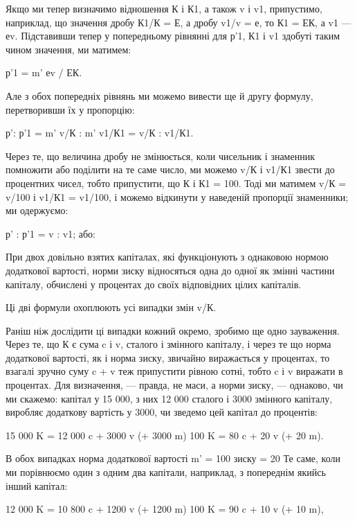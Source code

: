 Якщо ми тепер визначимо відношення К і К1, а також
v і v1, припустимо, наприклад, що значення дробу К1/К = Е, а дробу
v1/v = е, то К1 = ЕК, а v1 — еv. Підставивши тепер у попередньому
рівнянні для р'1, К1 і v1 здобуті таким чином значення,
ми матимем:

р'1 = m' еv / ЕК.

Але з обох попередніх рівнянь ми можемо вивести ще й другу
формулу, перетворивши їх у пропорцію:

р': р'1 = m' v/К : m' v1/К1 = v/К : v1/К1.

Через те, що величина дробу не змінюється, коли чисельник
і знаменник помножити або поділити на те саме число, ми можемо
v/К і v1/К1 звести до процентних чисел, тобто припустити, що
К і К1 = 100. Тоді ми матимем v/К = v/100 і v1/К1 = v1/100, і можемо відкинути
у наведеній пропорції знаменники; ми одержуємо:

р' : р'1 = v : v1; або:

При двох довільно взятих капіталах, які функціонують з однаковою
нормою додаткової вартості, норми зиску відносяться
одна до одної як змінні частини капіталу, обчислені у процентах
до своїх відповідних цілих капіталів.

Ці дві формули охоплюють усі випадки змін v/К.

Раніш ніж дослідити ці випадки кожний окремо, зробимо
ще одно зауваження. Через те, що К є сума c і v, сталого і змінного
капіталу, і через те що норма додаткової вартості, як
і норма зиску, звичайно виражається у процентах, то взагалі
зручно суму c + v теж припустити рівною сотні, тобто c і v
виражати в процентах. Для визначення, — правда, не маси, а
норми зиску, — однаково, чи ми скажемо: капітал у 15 000,
з них 12 000 сталого і 3000 змінного капіталу, виробляє додаткову
вартість у 3000, чи зведемо цей капітал до процентів:

15 000 K = 12 000 c + 3000 v (+ 3000 m)
100 K = 80 c + 20 v (+ 20 m).

В обох випадках норма додаткової вартості m' = 100%
зиску = 20%
Те саме, коли ми порівнюємо один з одним два капітали,
наприклад, з попереднім якийсь інший капітал:

12 000 K = 10 800 c + 1200 v (+ 1200 m)
100 K = 90 c + 10 v (+ 10 m),
